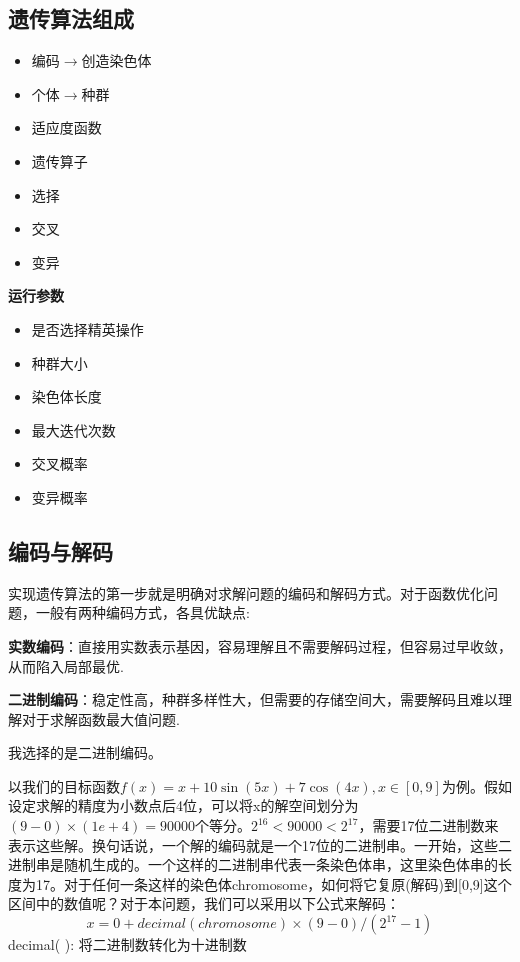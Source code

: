\documentclass[11pt,a4paper,oneside]{book}
\begin{document}
\subsection{遗传算法组成}
\begin{tcolorbox}[colback=pink!10!white,colframe=pink!100!black]
\begin{itemize}
	\item 编码$ \rightarrow $创造染色体
	\item 个体$ \rightarrow $种群
	\item 适应度函数
	\item 遗传算子
	\item 选择
	\item 交叉
	\item 变异
\end{itemize}
\end{tcolorbox}

\textbf{运行参数}
\begin{itemize}
	\item 是否选择精英操作
	\item 种群大小
	\item 染色体长度
	\item 最大迭代次数
	\item 交叉概率
	\item 变异概率
\end{itemize}

\subsection{编码与解码}
实现遗传算法的第一步就是明确对求解问题的编码和解码方式。对于函数优化问题，一般有两种编码方式，各具优缺点:

\textbf{实数编码}：直接用实数表示基因，容易理解且不需要解码过程，但容易过早收敛，从而陷入局部最优.

\textbf{二进制编码}：稳定性高，种群多样性大，但需要的存储空间大，需要解码且难以理解对于求解函数最大值问题.

我选择的是二进制编码。


以我们的目标函数$  f(x)=x + 10\sin(5x)+7\cos(4x), x\in[0,9]  $为例。假如设定求解的精度为小数点后4位，可以将x的解空间划分为$  (9-0)\times(1e+4)=90000 $个等分。$ 2^{16}<90000<2^{17} $，需要17位二进制数来表示这些解。换句话说，一个解的编码就是一个17位的二进制串。一开始，这些二进制串是随机生成的。一个这样的二进制串代表一条染色体串，这里染色体串的长度为17。对于任何一条这样的染色体chromosome，如何将它复原(解码)到[0,9]这个区间中的数值呢？对于本问题，我们可以采用以下公式来解码：
\begin{equation}
x = 0 + decimal(chromosome)\times(9-0)/(2^{17}-1)
\end{equation}
decimal( ): 将二进制数转化为十进制数
\end{document}
